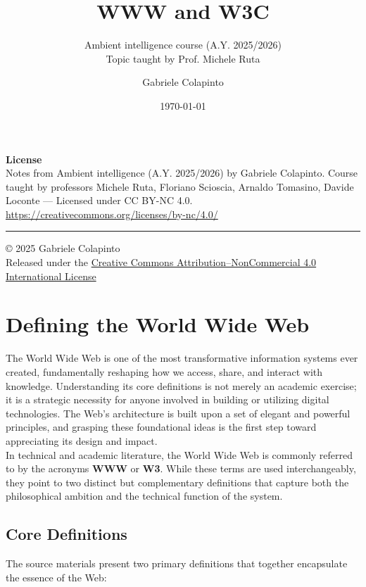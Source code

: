 \documentclass{scrbook}
\title{WWW and W3C}
\subtitle{Ambient intelligence course (A.Y. 2025/2026)\\Topic taught by Prof. Michele Ruta}
\author{Gabriele Colapinto}
\date{\today}
\begin{document}
\maketitle
\thispagestyle{empty}

{\Large\textbf{License}} \\
{Notes from Ambient intelligence (A.Y. 2025/2026) by Gabriele Colapinto. 
Course taught by professors Michele Ruta, Floriano Scioscia, Arnaldo Tomasino, Davide Loconte — 
Licensed under CC BY-NC 4.0.\\
\url{https://creativecommons.org/licenses/by-nc/4.0/}}

\vspace*{\fill}
\rule{\textwidth}{0.2pt}
\small{© 2025 Gabriele Colapinto \\
Released under the \href{https://creativecommons.org/licenses/by-nc/4.0/}{Creative Commons Attribution–NonCommercial 4.0 International License}}

\clearpage

\tableofcontents

\chapter{Defining the World Wide Web}

The World Wide Web is one of the most transformative information systems ever created, fundamentally reshaping how we access, share, and interact with knowledge. Understanding its core definitions is not merely an academic exercise; it is a strategic necessity for anyone involved in building or utilizing digital technologies. The Web's architecture is built upon a set of elegant and powerful principles, and grasping these foundational ideas is the first step toward appreciating its design and impact. \\

In technical and academic literature, the World Wide Web is commonly referred to by the acronyms \textbf{WWW} or \textbf{W3}. While these terms are used interchangeably, they point to two distinct but complementary definitions that capture both the philosophical ambition and the technical function of the system.

\section{Core Definitions}

The source materials present two primary definitions that together encapsulate the essence of the Web: \\
\end{document}
